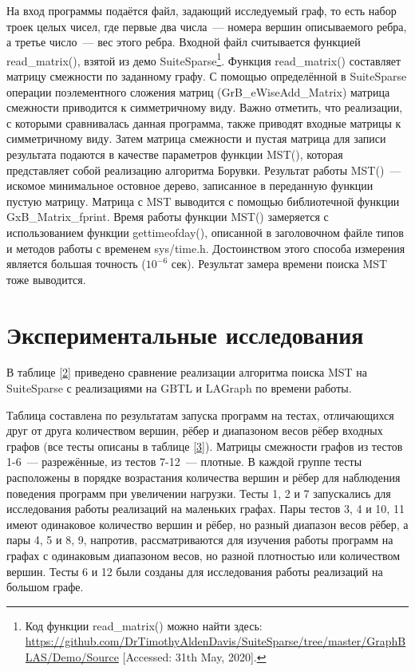 \documentclass[14pt]{matmex-diploma-custom}
\begin{document}
На вход программы подаётся файл, задающий исследуемый граф, то есть набор троек целых чисел, где первые два числа~--- номера вершин описываемого ребра, а третье число~--- вес этого ребра. Входной файл считывается функцией read\_matrix(), взятой из демо SuiteSparse\footnote{Код функции read\_matrix() можно найти здесь: \url{https://github.com/DrTimothyAldenDavis/SuiteSparse/tree/master/GraphBLAS/Demo/Source} [Accessed: 31th May, 2020].}. Функция read\_matrix() составляет матрицу смежности по заданному графу. С помощью определённой в SuiteSparse операции поэлементного сложения матриц (GrB\_eWiseAdd\_Matrix) матрица смежности приводится к симметричному виду. Важно отметить, что реализации, с которыми сравнивалась данная программа, также приводят входные матрицы к симметричному виду. Затем матрица смежности и пустая матрица для записи результата подаются в качестве параметров функции MST(), которая представляет собой реализацию алгоритма Борувки. Результат работы MST()~--- искомое минимальное остовное дерево, записанное в переданную функции пустую матрицу. Матрица с MST выводится с помощью библиотечной функции GxB\_Matrix\_fprint. Время работы функции MST() замеряется с использованием функции gettimeofday(), описанной в заголовочном файле типов и методов работы с временем sys/time.h. Достоинством этого способа измерения является большая точность ($10^{-6}$ сек). Результат замера времени поиска MST тоже выводится.

\section{Экспериментальные исследования}\label{1}
В таблице \ref{2} приведено сравнение реализации алгоритма поиска MST на SuiteSparse с реализациями на GBTL и LAGraph по времени работы. 

Таблица составлена по результатам запуска программ на тестах, отличающихся друг от друга количеством вершин, рёбер и диапазоном весов рёбер входных графов (все тесты описаны в таблице \ref{3}). Матрицы смежности графов из тестов 1-6~--- разрежённые, из тестов 7-12~--- плотные. В каждой группе тесты расположены в порядке возрастания количества вершин и рёбер для наблюдения поведения программ при увеличении нагрузки. Тесты 1, 2 и 7 запускались для исследования работы реализаций на маленьких графах. Пары тестов 3, 4 и 10, 11 имеют одинаковое количество вершин и рёбер, но разный диапазон весов рёбер, а пары 4, 5 и 8, 9, напротив, рассматриваются для изучения работы программ на графах с одинаковым диапазоном весов, но разной плотностью или количеством вершин. Тесты 6 и 12 были созданы для исследования работы реализаций на большом графе.
\end{document}
